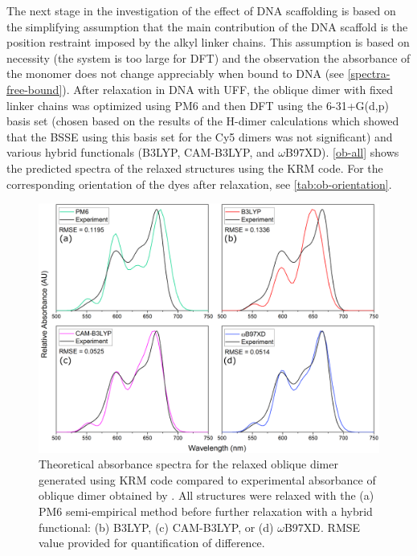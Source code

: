 The next stage in the investigation of the effect of DNA scaffolding is based on the simplifying assumption that the main contribution of the DNA scaffold is the position restraint imposed by the alkyl linker chains. This assumption is based on necessity (the system is too large for DFT) and the observation the absorbance of the monomer does not change appreciably when bound to DNA (see \autoref{spectra-free-bound}). After relaxation in DNA with UFF, the oblique dimer with fixed linker chains was optimized using PM6 and then DFT using the 6-31+G(d,p) basis set (chosen based on the results of the H-dimer calculations which showed that the BSSE using this basis set for the Cy5 dimers was not significant) and various hybrid functionals (B3LYP, CAM-B3LYP, and $\omega$B97XD). \autoref{ob-all} shows the predicted spectra of the relaxed structures using the KRM code. For the corresponding orientation of the dyes after relaxation, see \autoref{tab:ob-orientation}. 
\begin{figure}[h!]
    \centering
    \includegraphics[width=0.8\linewidth]{figures/pub1/obdimer-all-ad.pdf}
    \caption{Theoretical absorbance spectra for the relaxed oblique dimer generated using KRM code compared to experimental absorbance of oblique dimer obtained by \cite{Cannon2017}. All structures were relaxed with the (a) PM6 semi-empirical method before further relaxation with a hybrid functional: (b) B3LYP, (c) CAM-B3LYP, or (d) $\omega$B97XD. RMSE value provided for quantification of difference.}\label{ob-all}
\end{figure}

